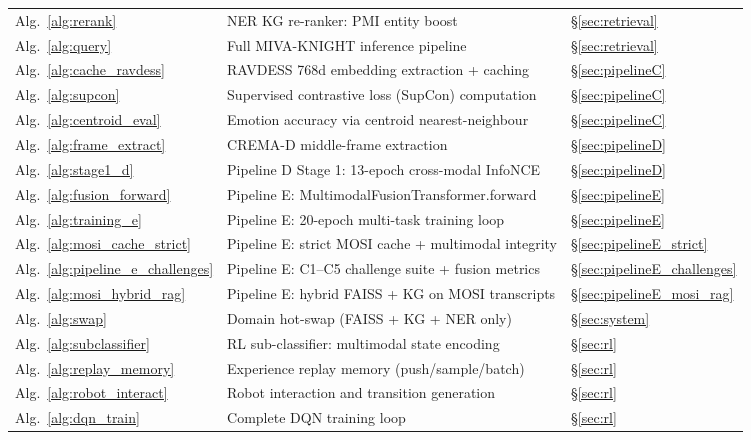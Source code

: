 \documentclass[12pt,a4paper]{article}
\theoremstyle{definition}
\theoremstyle{plain}
\theoremstyle{remark}
\begin{document}
\begin{longtable}{p{4.0cm}p{7.0cm}p{3.2cm}}
Alg.~\ref{alg:rerank} & NER KG re-ranker: PMI entity boost & \S\ref{sec:retrieval} \\[3pt]
Alg.~\ref{alg:query} & Full MIVA-KNIGHT inference pipeline & \S\ref{sec:retrieval} \\[3pt]
Alg.~\ref{alg:cache_ravdess} & RAVDESS 768d embedding extraction + caching & \S\ref{sec:pipelineC} \\[3pt]
Alg.~\ref{alg:supcon} & Supervised contrastive loss (SupCon) computation & \S\ref{sec:pipelineC} \\[3pt]
Alg.~\ref{alg:centroid_eval} & Emotion accuracy via centroid nearest-neighbour & \S\ref{sec:pipelineC} \\[3pt]
Alg.~\ref{alg:frame_extract} & CREMA-D middle-frame extraction & \S\ref{sec:pipelineD} \\[3pt]
Alg.~\ref{alg:stage1_d} & Pipeline D Stage 1: 13-epoch cross-modal InfoNCE & \S\ref{sec:pipelineD} \\[3pt]
Alg.~\ref{alg:fusion_forward} & Pipeline E: MultimodalFusionTransformer.forward & \S\ref{sec:pipelineE} \\[3pt]
Alg.~\ref{alg:training_e} & Pipeline E: 20-epoch multi-task training loop & \S\ref{sec:pipelineE} \\[3pt]
Alg.~\ref{alg:mosi_cache_strict} & Pipeline E: strict MOSI cache + multimodal integrity & \S\ref{sec:pipelineE_strict} \\[3pt]
Alg.~\ref{alg:pipeline_e_challenges} & Pipeline E: C1--C5 challenge suite + fusion metrics & \S\ref{sec:pipelineE_challenges} \\[3pt]
Alg.~\ref{alg:mosi_hybrid_rag} & Pipeline E: hybrid FAISS + KG on MOSI transcripts & \S\ref{sec:pipelineE_mosi_rag} \\[3pt]
Alg.~\ref{alg:swap} & Domain hot-swap (FAISS + KG + NER only) & \S\ref{sec:system} \\[3pt]
Alg.~\ref{alg:subclassifier} & RL sub-classifier: multimodal state encoding & \S\ref{sec:rl} \\[3pt]
Alg.~\ref{alg:replay_memory} & Experience replay memory (push/sample/batch) & \S\ref{sec:rl} \\[3pt]
Alg.~\ref{alg:robot_interact} & Robot interaction and transition generation & \S\ref{sec:rl} \\[3pt]
Alg.~\ref{alg:dqn_train} & Complete DQN training loop & \S\ref{sec:rl} \\[3pt]
\end{longtable}

\end{document}
